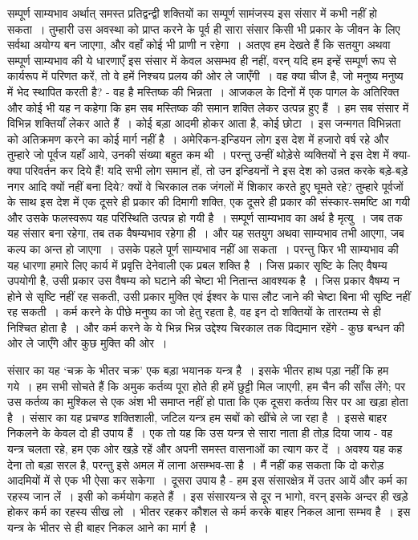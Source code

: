 सम्पूर्ण साम्यभाव अर्थात् समस्त प्रतिद्वन्द्वी शक्तियों का सम्पूर्ण सामंजस्य इस संसार में कभी नहीं हो सकता~। तुम्हारी उस अवस्था को प्राप्त करने के पूर्व ही सारा संसार किसी भी प्रकार के जीवन के लिए सर्वथा अयोग्य बन जाएगा, और वहाँ कोई भी प्राणी न रहेगा~। अतएव हम देखते हैं कि सतयुग अथवा सम्पूर्ण साम्यभाव की ये धारणाएँ इस संसार में केवल असम्भव ही नहीं, वरन् यदि हम इन्हें सम्पूर्ण रूप से कार्यरूप में परिणत करें, तो वे हमें निश्चय प्रलय की ओर ले जाएँगी~। वह क्या चीज है, जो मनुष्य मनुष्य में भेद स्थापित करती है? - वह है मस्तिष्क की भिन्नता~। आजकल के दिनों में एक पागल के अतिरिक्त और कोई भी यह न कहेगा कि हम सब मस्तिष्क की समान शक्ति लेकर उत्पन्न हुए हैं~। हम सब संसार में विभिन्न शक्तियाँ लेकर आते हैं~। कोई बड़ा आदमी होकर आता है, कोई छोटा~। इस जन्मगत विभिन्नता को अतिक्रमण करने का कोई मार्ग नहीं है~। अमेरिकन-इन्डियन लोग इस देश में हजारो वर्ष रहे और तुम्हारे जो पूर्वज यहाँ आये, उनकी संख्या बहुत कम थी~। परन्तु उन्हीं थोड़ेसे व्यक्तियों ने इस देश में क्या-क्या परिवर्तन कर दिये हैं! यदि सभी लोग समान हों, तो उन इन्डियनों ने इस देश को उन्नत करके बड़े-बड़े नगर आदि क्यों नहीं बना दिये? क्यों वे चिरकाल तक जंगलों में शिकार करते हुए घूमते रहे? तुम्हारे पूर्वजों के साथ इस देश में एक दूसरे ही प्रकार की दिमागी शक्ति, एक दूसरे ही प्रकार की संस्कार-समष्टि आ गयी और उसके फलस्वरूप यह परिस्थिति उत्पन्न हो गयी है~। सम्पूर्ण साम्यभाव का अर्थ है मृत्यु~। जब तक यह संसार बना रहेगा, तब तक वैषम्यभाव रहेगा ही~। और यह सतयुग अथवा साम्यभाव तभी आएगा, जब कल्प का अन्त हो जाएगा~। उसके पहले पूर्ण साम्यभाव नहीं आ सकता~। परन्तु फिर भी साम्यभाव की यह धारणा हमारे लिए कार्य में प्रवृत्ति देनेवाली एक प्रबल शक्ति है~। जिस प्रकार सृष्टि के लिए वैषम्य उपयोगी है, उसी प्रकार उस वैषम्य को घटाने की चेष्टा भी नितान्त आवश्यक है~। जिस प्रकार वैषम्य न होने से सृष्टि नहीं रह सकती, उसी प्रकार मुक्ति एवं ईश्वर के पास लौट जाने की चेष्टा बिना भी सृष्टि नहीं रह सकती~। कर्म करने के पीछे मनुष्य का जो हेतु रहता है, वह इन दो शक्तियों के तारतम्य से ही निश्चित होता है~। और कर्म करने के ये भिन्न भिन्न उद्देश्य चिरकाल तक विद्यमान रहेंगे - कुछ बन्धन की ओर ले जाएँगे और कुछ मुक्ति की ओर~।

संसार का यह ‘चक्र के भीतर चक्र’ एक बड़ा भयानक यन्त्र है~। इसके भीतर हाथ पड़ा नहीं कि हम गये~। हम सभी सोचते हैं कि अमुक कर्तव्य पूरा होते ही हमें छुट्टी मिल जाएगी, हम चैन की साँस लेंगे; पर उस कर्तव्य का मुश्किल से एक अंश भी समाप्त नहीं हो पाता कि एक दूसरा कर्तव्य सिर पर आ खड़ा होता है~। संसार का यह प्रचण्ड शक्तिशाली, जटिल यन्त्र हम सबों को खींचे ले जा रहा है~। इससे बाहर निकलने के केवल दो ही उपाय हैं~। एक तो यह कि उस यन्त्र से सारा नाता ही तोड़ दिया जाय - वह यन्त्र चलता रहे, हम एक ओर खड़े रहें और अपनी समस्त वासनाओं का त्याग कर दें~। अवश्य यह कह देना तो बड़ा सरल है, परन्तु इसे अमल में लाना असम्भव-सा है~। मैं नहीं कह सकता कि दो करोड़ आदमियों में से एक भी ऐसा कर सकेगा~। दूसरा उपाय है - हम इस संसारक्षेत्र में उतर आयें और कर्म का रहस्य जान लें~। इसी को कर्मयोग कहते हैं~। इस संसारयन्त्र से दूर न भागो, वरन् इसके अन्दर ही खड़े होकर कर्म का रहस्य सीख लो~। भीतर रहकर कौशल से कर्म करके बाहर निकल आना सम्भव है~। इस यन्त्र के भीतर से ही बाहर निकल आने का मार्ग है~।

